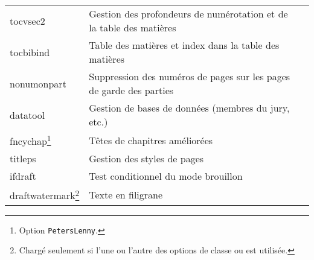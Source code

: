 \begin{tabular}{>{\sffamily}lll}
  tocvsec2                                                                                                                                                                                                                         & Gestion des profondeurs de numérotation et de la table des matières \\
  tocbibind                                                                                                                                                                                                                        & Table des matières et index dans  la table des matières             \\
  nonumonpart
  & Suppression des  numéros de pages sur les pages de garde des parties          \\
  datatool                                                                                                                                                                                                                         & Gestion de bases de données (membres du jury, etc.)                 \\
  fncychap\footnote{Option \lstinline+PetersLenny+.}                                                                                                                                                                                       & Têtes de chapitres améliorées                                       \\
  titleps                                                                                                                                                                                                                          & Gestion des styles de pages                                         \\
  ifdraft                                                                                                                                                                                                                          & Test conditionnel du mode brouillon                                 \\
  draftwatermark\footnote{Chargé seulement si l'une ou l'autre des
    options de classe {draft} ou
    {intermediateversion} est utilisée.}                                                                                                                                                                                                                   & Texte en filigrane                                                  \\

\end{tabular}
